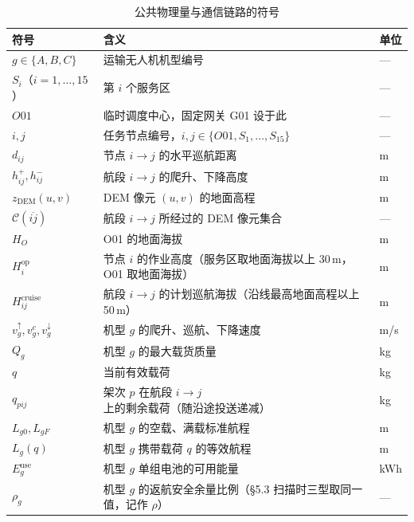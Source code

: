 \begin{table}[htbp]
	\caption{公共物理量与通信链路的符号}
	\label{tab:symbols}
	\centering
	\small
	\begin{tabularx}{\textwidth}{@{}l X l@{}}
		\toprule
		符号 & 含义 & 单位 \\
		\midrule
		$g\in\{A,B,C\}$ & 运输无人机机型编号 & --- \\
		$S_i$（$i=1,\dots,15$） & 第 $i$ 个服务区 & --- \\
		$O01$ & 临时调度中心，固定网关 G01 设于此 & --- \\
		$i,j$ & 任务节点编号，$i,j\in\{O01,S_1,\dots,S_{15}\}$ & --- \\
		$d_{ij}$ & 节点 $i\to j$ 的水平巡航距离 & m \\
		$h^{+}_{ij},h^{-}_{ij}$ & 航段 $i\to j$ 的爬升、下降高度 & m \\
		$z_{\mathrm{DEM}}(u,v)$ & DEM 像元 $(u,v)$ 的地面高程 & m \\
		$\mathcal{C}(\overline{ij})$ & 航段 $i\to j$ 所经过的 DEM 像元集合 & --- \\
		$H_O$ & O01 的地面海拔 & m \\
		$H^{\mathrm{op}}_i$ & 节点 $i$ 的作业高度（服务区取地面海拔以上 30\,m，O01 取地面海拔） & m \\
		$H^{\mathrm{cruise}}_{ij}$ & 航段 $i\to j$ 的计划巡航海拔（沿线最高地面高程以上 50\,m） & m \\
		$v^{\uparrow}_g,v^{c}_g,v^{\downarrow}_g$ & 机型 $g$ 的爬升、巡航、下降速度 & m/s \\
		$Q_g$ & 机型 $g$ 的最大载货质量 & kg \\
		$q$ & 当前有效载荷 & kg \\
		$q_{pij}$ & 架次 $p$ 在航段 $i\to j$ 上的剩余载荷（随沿途投送递减） & kg \\
		$L_{g0},L_{gF}$ & 机型 $g$ 的空载、满载标准航程 & m \\
		$L_g(q)$ & 机型 $g$ 携带载荷 $q$ 的等效航程 & m \\
		$E_g^{\mathrm{use}}$ & 机型 $g$ 单组电池的可用能量 & kWh \\
		$\rho_g$ & 机型 $g$ 的返航安全余量比例（§5.3 扫描时三型取同一值，记作 $\rho$） & --- \\

\end{tabularx}
\end{table}
